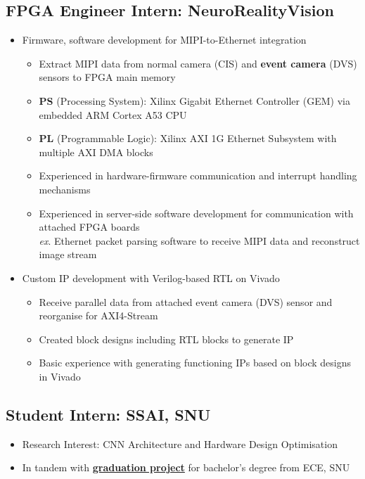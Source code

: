 \documentclass[10pt]{article}
\begin{document}
\subsection*{FPGA Engineer Intern: NeuroRealityVision}
\begin{itemize}
  \item Firmware, software development for MIPI-to-Ethernet integration
    \begin{itemize}
      \item Extract MIPI data from normal camera (CIS) and
        \textbf{event camera} (DVS) sensors to FPGA main memory
      \item \textbf{PS} (Processing System): Xilinx Gigabit Ethernet Controller
        (GEM) via embedded ARM Cortex A53 CPU
      \item \textbf{PL} (Programmable Logic): Xilinx AXI 1G Ethernet Subsystem
        with multiple AXI DMA blocks
      \item Experienced in hardware-firmware communication and interrupt
        handling mechanisms
      \item Experienced in server-side software development for communication
        with attached FPGA boards \\
        \textit{ex}. Ethernet packet parsing software to receive MIPI data and
          reconstruct image stream
    \end{itemize}
  \item Custom IP development with Verilog-based RTL on Vivado
    \begin{itemize}
      \item Receive parallel data from attached event camera (DVS) sensor and
        reorganise for AXI4-Stream
      \item Created block designs including RTL blocks to generate IP
      \item Basic experience with generating functioning IPs based on block
        designs in Vivado
    \end{itemize}
\end{itemize}

\subsection*{Student Intern: SSAI, SNU}
\begin{itemize}
  \item Research Interest: CNN Architecture and Hardware Design Optimisation
  \item In tandem with \textbf{\hyperref[edu:gradproj]{graduation project}} for
    bachelor's degree from ECE, SNU
\end{itemize}
\end{document}
